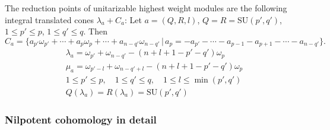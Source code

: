 The reduction points of unitarizable highest weight modules are the following integral translated cones $\lambda_a + C_a$:
Let $a=(Q,R,l)$, $Q=R=\mathrm{SU}(p',q')$, $1\leq p' \leq p$, $1\leq q'\leq q$. Then
\[
 C_a = \{a_{p'}\omega_{p'} + \cdots + a_p\omega_p + \cdots + a_{n-q'}\omega_{n-q'} \,|\, a_p=-a_{p'}-\cdots -a_{p-1}-a_{p+1} - \cdots - a_{n-q'} \}.
\]
\begin{gather*}
  \lambda_a=\omega_{p'} + \omega_{n-q'} - (n+l+1-p'-q')\omega_p   \\
  \mu_a = \omega_{p'-l}+\omega_{n-q'+l}-(n+l+1-p'-q')\omega_p\\
  1\leq p' \leq p,\quad 1\leq q' \leq q,\quad 1\leq l \leq \min(p',q')\\
  Q(\lambda_a)=R(\lambda_a)=\mathrm{SU}(p',q')
\end{gather*}

\subsubsection{Nilpotent cohomology in detail}

